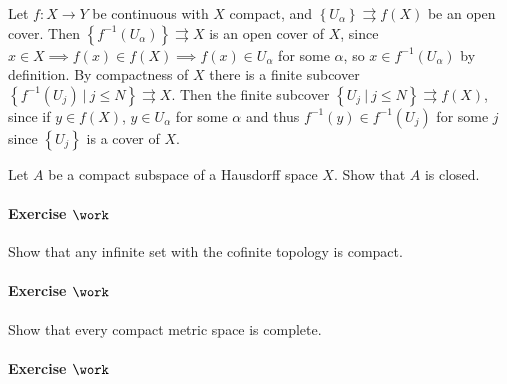 \begin{solution}

\hfill

\begin{concept}

\hfill

\end{concept}

Let \(f:X\to Y\) be continuous with \(X\) compact, and
\(\left\{{U_\alpha}\right\} \rightrightarrows f(X)\) be an open cover.
Then \(\left\{{f^{-1}(U_\alpha)}\right\} \rightrightarrows X\) is an
open cover of \(X\), since
\(x\in X \implies f(x) \in f(X) \implies f(x) \in U_\alpha\) for some
\(\alpha\), so \(x\in f^{-1}(U_\alpha)\) by definition. By compactness
of \(X\) there is a finite subcover
\(\left\{{f^{-1}(U_j) {~\mathrel{\Big|}~}j\leq N}\right\} \rightrightarrows X\).
Then the finite subcover
\(\left\{{U_j{~\mathrel{\Big|}~}j\leq N}\right\} \rightrightarrows f(X)\),
since if \(y\in f(X)\), \(y\in U_\alpha\) for some \(\alpha\) and thus
\(f^{-1}(y) \in f^{-1}(U_j)\) for some \(j\) since
\(\left\{{U_j}\right\}\) is a cover of \(X\).

\end{solution}

Let \(A\) be a compact subspace of a Hausdorff space \(X\). Show that
\(A\) is closed.

\hypertarget{exercise-work-11}{%
\paragraph{\texorpdfstring{Exercise
\(\work\)}{Exercise \textbackslash work}}\label{exercise-work-11}}

Show that any infinite set with the cofinite topology is compact.

\hypertarget{exercise-work-12}{%
\paragraph{\texorpdfstring{Exercise
\(\work\)}{Exercise \textbackslash work}}\label{exercise-work-12}}

Show that every compact metric space is complete.

\hypertarget{exercise-work-13}{%
\paragraph{\texorpdfstring{Exercise
\(\work\)}{Exercise \textbackslash work}}\label{exercise-work-13}}

